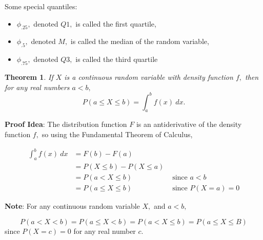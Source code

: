 \documentclass[
]{book}
\providecommand{\tightlist}{%
  \setlength{\itemsep}{0pt}\setlength{\parskip}{0pt}}
\newtheorem{theorem}{Theorem}[chapter]
\theoremstyle{definition}
\theoremstyle{definition}
\theoremstyle{definition}
\theoremstyle{definition}
\theoremstyle{remark}
\begin{document}
Some special quantiles:

\begin{itemize}
\tightlist
\item
  \(\phi_.25,\) denoted \(Q1,\) is called the first quartile,
\item
  \(\phi_.5,\) denoted \(M,\) is called the median of the random variable,
\item
  \(\phi_.75,\) denoted \(Q3,\) is called the third quartile
\end{itemize}

\begin{theorem}
If \(X\) is a continuous random variable with density function \(f,\) then for any real numbers \(a < b,\)
\[P(a \leq X \leq b) = \int_a^b f(x)~dx.\]
\end{theorem}

\textbf{Proof Idea}: The distribution function \(F\) is an antiderivative of the density function \(f,\) so using the Fundamental Theorem of Calculus,

\begin{align*}
\int_a^b f(x)~dx  &= F(b) - F(a) \\
                  &= P(X\leq b) - P(X \leq a) \\
                  &= P(a < X \leq b) &\text{ since } a < b\\
                  &= P(a \leq X \leq b) &\text{ since } P(X = a) = 0
\end{align*}

\textbf{Note}: For any continuous random variable \(X,\) and \(a < b,\)

\[P(a < X < b) = P(a \leq X < b) = P(a < X \leq b) = P(a \leq X \leq B)\] since \(P(X = c) = 0\) for any real number \(c\).
\end{document}
